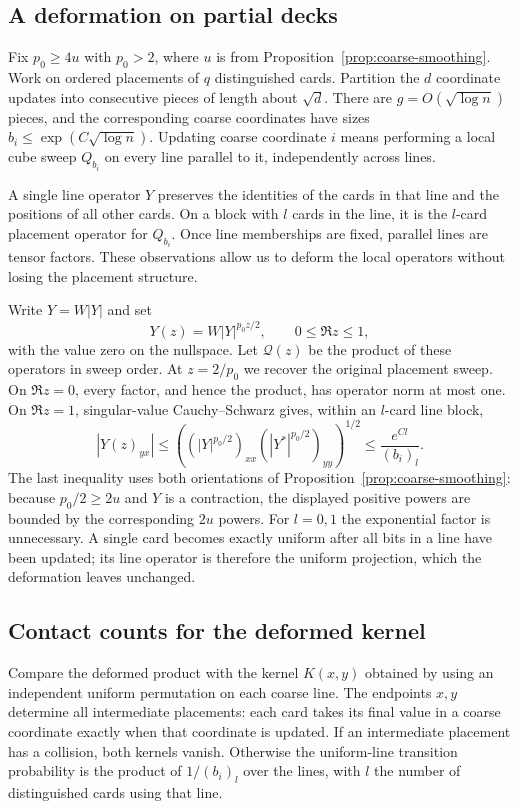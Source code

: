 \subsection{A deformation on partial decks}
Fix $p_0\ge4u$ with $p_0>2$, where $u$ is from Proposition~\ref{prop:coarse-smoothing}. Work on ordered placements of $q$ distinguished cards. Partition the $d$ coordinate updates into consecutive pieces of length about $\sqrt d$. There are $g=O(\sqrt{\log n})$ pieces, and the corresponding coarse coordinates have sizes $b_i\le\exp(C\sqrt{\log n})$. Updating coarse coordinate $i$ means performing a local cube sweep $Q_{b_i}$ on every line parallel to it, independently across lines.

A single line operator $Y$ preserves the identities of the cards in that line and the positions of all other cards. On a block with $l$ cards in the line, it is the $l$-card placement operator for $Q_{b_i}$. Once line memberships are fixed, parallel lines are tensor factors. These observations allow us to deform the local operators without losing the placement structure.

Write $Y=W|Y|$ and set
\[
 Y(z)=W|Y|^{p_0z/2},\qquad 0\le\Re z\le1,
\]
with the value zero on the nullspace. Let $\mathcal Q(z)$ be the product of these operators in sweep order. At $z=2/p_0$ we recover the original placement sweep. On $\Re z=0$, every factor, and hence the product, has operator norm at most one. On $\Re z=1$, singular-value Cauchy--Schwarz gives, within an $l$-card line block,
\begin{equation}
 |Y(z)_{yx}|\le
 \left((|Y|^{p_0/2})_{xx}(|Y^*|^{p_0/2})_{yy}\right)^{1/2}
 \le\frac{e^{Cl}}{(b_i)_l}.
 \label{ten:lowplanes:eq:11}
\end{equation}
The last inequality uses both orientations of Proposition~\ref{prop:coarse-smoothing}: because $p_0/2\ge2u$ and $Y$ is a contraction, the displayed positive powers are bounded by the corresponding $2u$ powers. For $l=0,1$ the exponential factor is unnecessary. A single card becomes exactly uniform after all bits in a line have been updated; its line operator is therefore the uniform projection, which the deformation leaves unchanged.

\subsection{Contact counts for the deformed kernel}
\label{ten:lowplanes:part:150}
Compare the deformed product with the kernel $K(x,y)$ obtained by using an independent uniform permutation on each coarse line. The endpoints $x,y$ determine all intermediate placements: each card takes its final value in a coarse coordinate exactly when that coordinate is updated. If an intermediate placement has a collision, both kernels vanish. Otherwise the uniform-line transition probability is the product of $1/(b_i)_l$ over the lines, with $l$ the number of distinguished cards using that line.

